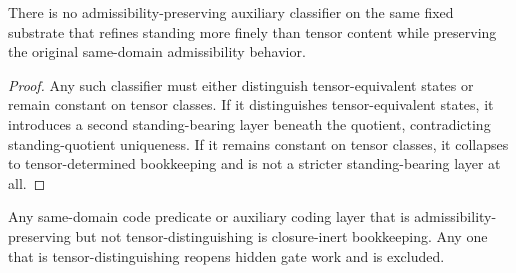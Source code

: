 \begin{theorem}
There is no admissibility-preserving auxiliary classifier on the same fixed substrate that refines standing more finely than tensor content while preserving the original same-domain admissibility behavior.
\end{theorem}

\begin{proof}
Any such classifier must either distinguish tensor-equivalent states or remain constant on tensor classes. If it distinguishes tensor-equivalent states, it introduces a second standing-bearing layer beneath the quotient, contradicting standing-quotient uniqueness. If it remains constant on tensor classes, it collapses to tensor-determined bookkeeping and is not a stricter standing-bearing layer at all.
\end{proof}

\begin{corollary}
Any same-domain code predicate or auxiliary coding layer that is admissibility-preserving but not tensor-distinguishing is closure-inert bookkeeping. Any one that is tensor-distinguishing reopens hidden gate work and is excluded.
\end{corollary}
